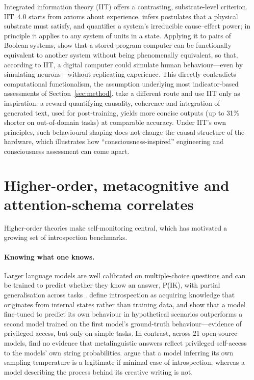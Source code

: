 \documentclass[11pt,a4paper]{article}
\begin{document}
Integrated information theory (IIT) offers a contrasting, substrate-level
criterion. IIT~4.0 \citep{albantakis2022integrated} starts from axioms about
experience, infers postulates that a physical substrate must satisfy, and
quantifies a system's irreducible cause--effect power; in principle it applies
to any system of units in a state. Applying it to pairs of Boolean systems,
\citet{findlay2024dissociating} show that a stored-program computer can be
functionally equivalent to another system without being phenomenally
equivalent, so that, according to IIT, a digital computer could simulate human
behaviour---even by simulating neurons---without replicating experience. This
directly contradicts computational functionalism, the assumption underlying
most indicator-based assessments of Section~\ref{sec:method}.
\citet{akbari2026iit} take a different route and use IIT only as inspiration:
a reward quantifying causality, coherence and integration of generated text,
used for post-training, yields more concise outputs (up to 31\% shorter on
out-of-domain tasks) at comparable accuracy. Under IIT's own principles, such
behavioural shaping does not change the causal structure of the hardware, which
illustrates how ``consciousness-inspired'' engineering and consciousness
assessment can come apart.

\section{Higher-order, metacognitive and attention-schema correlates}
\label{sec:hot}

Higher-order theories make self-monitoring central, which has motivated a
growing set of introspection benchmarks.

\paragraph{Knowing what one knows.} Larger language models are well calibrated
on multiple-choice questions and can be trained to predict whether they know
an answer, P(IK), with partial generalisation across tasks
\citep{kadavath2022language}. \citet{binder2024looking} define introspection as
acquiring knowledge that originates from internal states rather than training
data, and show that a model fine-tuned to predict its own behaviour in
hypothetical scenarios outperforms a second model trained on the first model's
ground-truth behaviour---evidence of privileged access, but only on simple
tasks. In contrast, across 21 open-source models, \citet{song2025language}
find no evidence that metalinguistic answers reflect privileged self-access to
the models' own string probabilities. \citet{comsa2025make} argue that a model
inferring its own sampling temperature is a legitimate if minimal case of
introspection, whereas a model describing the process behind its creative
writing is not.
\end{document}
